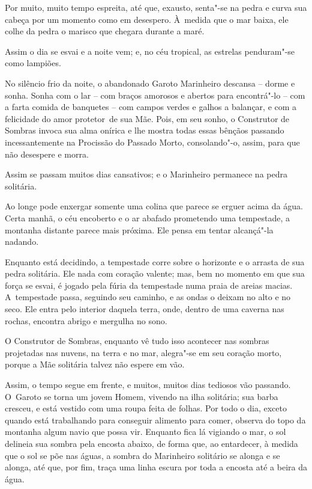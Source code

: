 Por muito, muito tempo espreita, até que, exausto, senta"-se na pedra
e curva sua cabeça por um momento como em desespero. À~medida que o
mar baixa, ele colhe da pedra o marisco que chegara durante a maré.

Assim o dia se esvai e a noite vem; e, no céu tropical, as estrelas
penduram"-se como lampiões.

No silêncio frio da noite, o abandonado Garoto Marinheiro descansa --
dorme e sonha. Sonha com o lar -- com braços amorosos e abertos
para encontrá"-lo -- com a farta comida de banquetes -- com campos verdes e
galhos a balançar, e com a felicidade do amor protetor~de sua Mãe.
Pois, em seu sonho, o Construtor de Sombras invoca sua alma onírica e
lhe mostra todas essas bênçãos passando incessantemente na Procissão do
Passado Morto, consolando"-o, assim, para que não desespere e morra.


Assim se passam muitos dias cansativos; e o Marinheiro permanece na
pedra solitária.

Ao longe pode enxergar somente uma colina que parece se erguer acima da
água. Certa manhã, o céu encoberto e o ar abafado prometendo uma
tempestade, a montanha distante parece mais próxima. Ele pensa em
tentar alcançá"-la nadando.

Enquanto está decidindo, a tempestade corre sobre o horizonte e o
arrasta de sua pedra solitária. Ele nada com coração valente; mas, bem
no momento em que sua força se esvai, é jogado pela fúria da tempestade
numa praia de areias macias. A~tempestade passa, seguindo seu caminho, e
as ondas o deixam no alto e no seco. Ele entra pelo interior daquela
terra, onde, dentro de uma caverna nas rochas, encontra abrigo e
mergulha no sono.

O Construtor de Sombras, enquanto vê tudo isso acontecer nas sombras
projetadas nas nuvens, na terra e no mar, alegra"-se em seu coração
morto, porque a Mãe solitária talvez não espere em vão.

\smallskip
Assim, o tempo segue em frente, e muitos, muitos dias tediosos vão
passando. O~Garoto se torna um jovem Homem, vivendo na ilha solitária;
sua barba cresceu, e está vestido com uma roupa feita de folhas. Por todo o
dia, exceto quando está trabalhando para conseguir alimento para comer,
observa do topo da montanha algum navio que possa vir. Enquanto fica lá
vigiando o mar, o sol delineia sua sombra pela encosta abaixo, de forma
que, ao entardecer, à medida que o sol se põe nas águas, a sombra do
Marinheiro solitário se alonga e se alonga, até que, por fim, traça uma
linha escura por toda a encosta até a beira da água.

